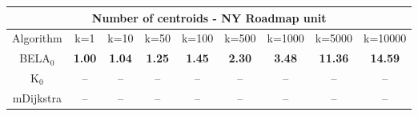 \begin{tabular}{c|cccccccc}\toprule
\multicolumn{9}{c}{Number of centroids - NY Roadmap unit}\\ \midrule
Algorithm & k=1 & k=10 & k=50 & k=100 & k=500 & k=1000 & k=5000 & k=10000 \\ \midrule
BELA$_0$ & \textbf{1.00} & \textbf{1.04} & \textbf{1.25} & \textbf{1.45} & \textbf{2.30} & \textbf{3.48} & \textbf{11.36} & \textbf{14.59} \\
K$_0$ & -- & -- & -- & -- & -- & -- & -- & -- \\
mDijkstra & -- & -- & -- & -- & -- & -- & -- & -- \\ \bottomrule 
\end{tabular}
